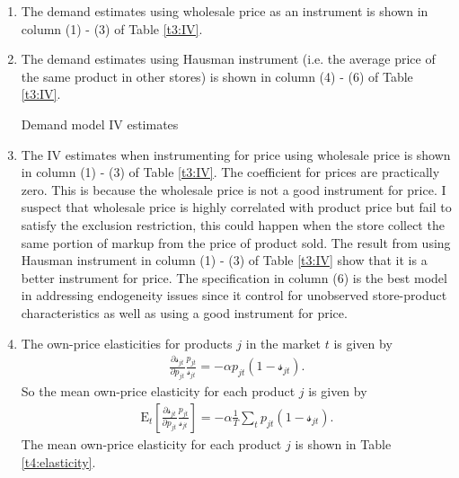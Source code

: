 \documentclass{article}
\newcommand{\E}{\text{E}}
\begin{document}
\begin{enumerate}
\begin{table}[H]
\centering
\begin{threeparttable}
\caption{Demand model OLS estimates}\label{t2:OLS}

\end{threeparttable}
\end{table}

\item The demand estimates using wholesale price as an instrument is shown in column (1) - (3) of Table \ref{t3:IV}.
\item The demand estimates using Hausman instrument (i.e. the average price of the same product in other
stores) is shown in column (4) - (6) of Table \ref{t3:IV}.

\begin{table}[H]
\centering
\begin{threeparttable}
\caption{Demand model IV estimates}\label{t3:IV}

\end{threeparttable}
\end{table}

\item The IV estimates when instrumenting for price using wholesale price is shown in column (1) - (3) of Table \ref{t3:IV}. The coefficient for prices are practically zero. This is because the wholesale price is not a good instrument for price. I suspect that wholesale price is highly correlated with product price but fail to satisfy the exclusion restriction, this could happen when the store collect the same portion of markup from the price of product sold. The result from using Hausman instrument in column (1) - (3) of Table \ref{t3:IV} show that it is a better instrument for price. The specification in column (6) is the best model in addressing endogeneity issues since it control for unobserved store-product characteristics as well as using a good instrument for price.

\item The own-price elasticities for products $j$ in the market $t$ is given by
\begin{align*}
    \frac{\partial\mathcal{s}_{jt}}{\partial p_{jt}}\frac{p_{jt}}{\mathcal{s}_{jt}}=-\alpha p_{jt}(1-\mathcal{s}_{jt}).
\end{align*}
So the mean own-price elasticity for each product $j$ is given by
\begin{align*}
    \E_t\left[\frac{\partial\mathcal{s}_{jt}}{\partial p_{jt}}\frac{p_{jt}}{\mathcal{s}_{jt}}\right]=-\alpha \frac{1}{T}\sum_{t}p_{jt}(1-\mathcal{s}_{jt}).
\end{align*}
The mean own-price elasticity for each product $j$ is shown in Table \ref{t4:elasticity}.


\end{enumerate}
\end{document}
